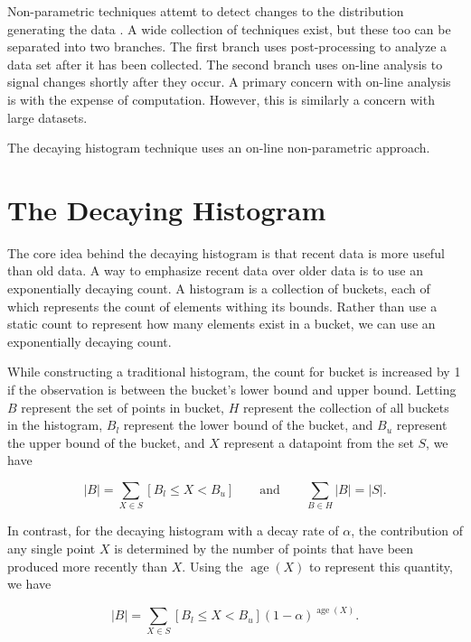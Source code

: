 \documentclass{sig-alternate}
\DeclareMathOperator{\age}{age}
\begin{document}
    Non-parametric techniques attemt to detect changes to the distribution
    generating the data \cite{brodsky1993nonparametric}. A wide collection of
    techniques exist, but these too can be separated into two branches. The
    first branch uses post-processing to analyze a data set after it has been
    collected. The second branch uses on-line analysis to signal changes shortly
    after they occur. A primary concern with on-line analysis is with the
    expense of computation. However, this is similarly a concern with large
    datasets.

    The decaying histogram technique uses an on-line non-parametric approach.

\section{The Decaying Histogram}
    The core idea behind the decaying histogram is that recent data is more
    useful than old data. A way to emphasize recent data over older data is to
    use an exponentially decaying count. A histogram is a collection of
    buckets, each of which represents the count of elements withing its bounds.
    Rather than use a static count to represent how many elements exist in a
    bucket, we can use an exponentially decaying count.

    While constructing a traditional histogram, the count for bucket is
    increased by 1 if the observation is between the bucket's lower bound and
    upper bound. Letting $B$ represent the set of points in bucket, $H$
    represent the collection of all buckets in the histogram, $B_l$
    represent the lower bound of the bucket, and $B_u$ represent
    the upper bound of the bucket, and $X$ represent a datapoint from the set
    $S$, we have

    \begin{displaymath}
        |B| = \sum_{X \in S} [B_l \leq X < B_u]
    \qquad
    \mbox{and}
    \qquad
        \sum_{B \in H} |B| = |S|.
    \end{displaymath}

    In contrast, for the decaying histogram with a decay rate of $\alpha$, the
    contribution of any single point $X$ is determined by the number of points
    that have been produced more recently than $X$. Using the $\age(X)$ to
    represent this quantity, we have

    \begin{displaymath}
        |B| = \sum_{X \in S} [B_l \leq X < B_u] (1 - \alpha)^{\age(X)} .
    \end{displaymath}
\end{document}
